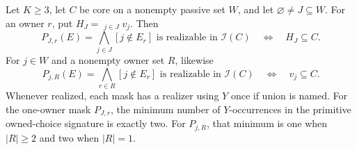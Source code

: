 \begin{proposition}
\label{core:prop:literal-source-masks}
Let $K\geq3$, let $C$ be core on a nonempty passive set $W$, and let
$\varnothing\ne J\subseteq W$. For an owner $r$, put
$H_J=\mathop{\star_r}_{j\in J}v_j$. Then
\[
 P_{J,r}(E)=\bigwedge_{j\in J}[j\notin E_r]
 \text{ is realizable in }\mathcal I(C)
 \quad\Longleftrightarrow\quad H_J\subseteq C.
\]
For $j\in W$ and a nonempty owner set $R$, likewise
\[
 P_{j,R}(E)=\bigwedge_{r\in R}[j\notin E_r]
 \text{ is realizable in }\mathcal I(C)
 \quad\Longleftrightarrow\quad v_j\subseteq C.
\]
Whenever realized, each mask has a realizer using $Y$ once if union
is named. For the one-owner mask $P_{J,r}$, the minimum number of
$Y$-occurrences in the primitive owned-choice signature is exactly two.
For $P_{j,R}$, that minimum is one when $|R|\geq2$ and two when $|R|=1$.
\end{proposition}

